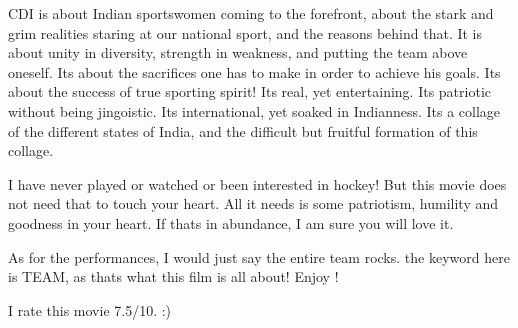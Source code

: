 \documentclass[]{article}
\begin{document}
CDI is about Indian sportswomen coming to the forefront, about the stark and grim realities staring at our national sport, and the reasons behind that. It is about unity in diversity, strength in weakness, and putting the team above oneself. Its about the sacrifices one has to make in order to achieve his goals. Its about the success of true sporting spirit! Its real, yet entertaining. Its patriotic without being jingoistic. Its international, yet soaked in Indianness. Its a collage of the different states of India, and the difficult but fruitful formation of this collage.

I have never played or watched or been interested in hockey! But this movie does not need that to touch your heart. All it needs is some patriotism, humility and goodness in your heart. If thats in abundance, I am sure you will love it.

As for the performances, I would just say the entire team rocks. the keyword here is TEAM, as thats what this film is all about! Enjoy !


I rate this movie 7.5/10. :)
\end{document}
